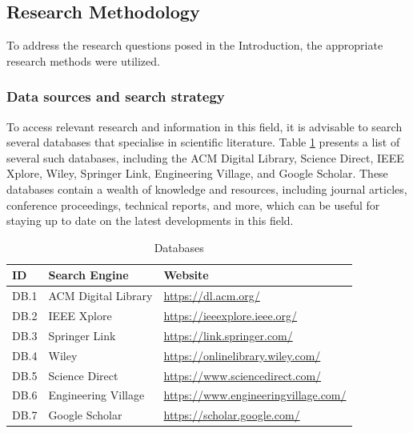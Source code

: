 \documentclass[conference]{IEEEtran}
\begin{document}
\subsection{Research Methodology} \label{sub:research-methodology}



To address the research questions posed in the Introduction, the appropriate
research methods were utilized.

\subsubsection{Data sources and search strategy} \label{sub:search-strategy}

To access relevant research and information in this field, it is advisable to
search several databases that specialise in scientific literature. Table
\ref{tab:databases} presents a list of several such databases, including the
ACM Digital Library, Science Direct, IEEE Xplore, Wiley, Springer Link,
Engineering Village, and Google Scholar. These databases contain a wealth of
knowledge and resources, including journal articles, conference proceedings,
technical reports, and more, which can be useful for staying up to date on the
latest developments in this field.

\begin{table}[!htb] \caption{Databases} \label{tab:databases}
  \begin{center}
    \begin{tabular}[c]{l|l|l} \textbf{ID} & \textbf{Search Engine} &
      \textbf{Website} \\
      \hline DB.1 & ACM Digital Library & \url{https://dl.acm.org/} \\
      \hline DB.2 & IEEE Xplore & \url{https://ieeexplore.ieee.org/} \\
      \hline DB.3 & Springer Link & \url{https://link.springer.com/} \\
      \hline DB.4 & Wiley & \url{https://onlinelibrary.wiley.com/} \\
      \hline DB.5 & Science Direct & \url{https://www.sciencedirect.com/} \\
      \hline DB.6 & Engineering Village &
      \url{https://www.engineeringvillage.com/} \\
      \hline DB.7 & Google Scholar & \url{https://scholar.google.com/} \\
    \end{tabular}
  \end{center}
\end{table}
\end{document}
